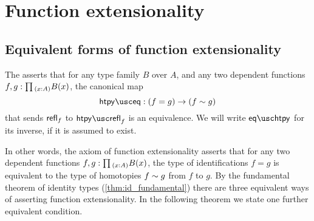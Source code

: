 \section{Function extensionality}
\label{chap:funext}

\subsection{Equivalent forms of function extensionality}
\begin{defn}
  The  asserts that for any type family $B$ over $A$, and any two dependent functions $f,g:\prd{x:A}B(x)$, the canonical map
  \begin{equation*}
    \htpyeq:(f=g)\to (f\htpy g)
  \end{equation*}
  that sends $\mathsf{refl}_{f}$ to $\htpyrefl_{f}$ is an equivalence. We will write $\eqhtpy$ for its inverse, if it is assumed to exist.
\end{defn}

In other words, the axiom of function extensionality asserts that for any two dependent functions $f,g:\prd{x:A}B(x)$, the type of identifications $f=g$ is equivalent to the type of homotopies $f\sim g$ from $f$ to $g$. By the fundamental theorem of identity types (\cref{thm:id_fundamental}) there are three equivalent ways of asserting function extensionality. In the following theorem we state one further equivalent condition.

